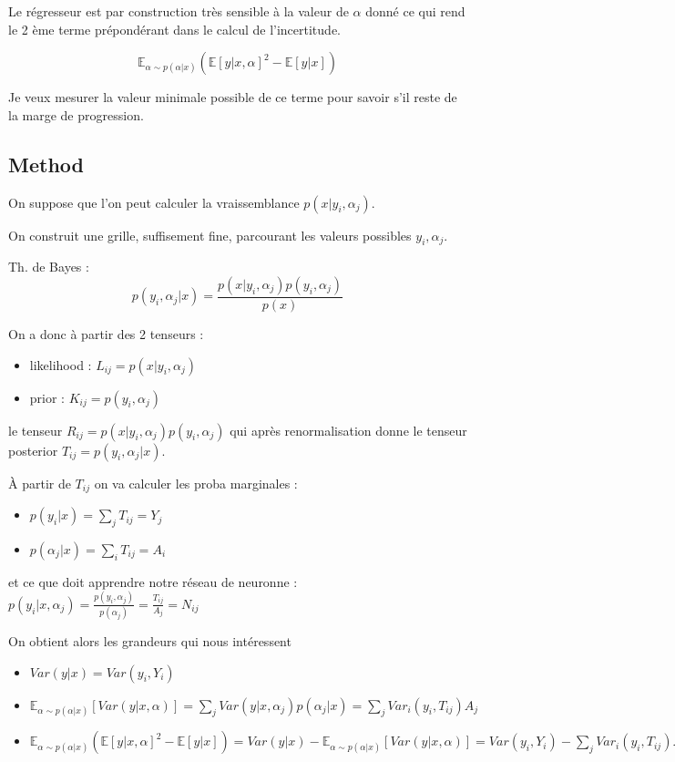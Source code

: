 Le régresseur est par construction très sensible à la valeur de $\alpha$ donné ce qui rend le 2 ème terme prépondérant dans le calcul de l'incertitude.

$$\mathbb E_{\alpha \sim p(\alpha|x)} \left (\mathbb E [y|x, \alpha]^2  - \mathbb E[y|x]\right )$$

Je veux mesurer la valeur minimale possible de ce terme pour savoir s'il reste de la marge de progression.

\subsection{Method} %
\label{sub:method}



On suppose que l'on peut calculer la vraissemblance $p(x|y_i, \alpha_j)$.

On construit une grille, suffisement fine, parcourant les valeurs possibles $y_i, \alpha_j$.

Th. de Bayes : 
$$
    p(y_i, \alpha_j | x) = \frac{p(x|y_i, \alpha_j) p(y_i, \alpha_j)}{p(x)}
$$

On a donc à partir des 2 tenseurs : 
\begin{itemize}
	\item likelihood : $L_{ij} = p(x|y_i, \alpha_j)$
	\item prior : $K_{ij} = p(y_i, \alpha_j)$ 
\end{itemize}

le tenseur $ R_{ij} = p(x|y_i, \alpha_j) p(y_i, \alpha_j) $ 
qui après renormalisation donne le tenseur posterior $ T_{ij} = p(y_i, \alpha_j | x)$.

À partir de $T_{ij}$ on va calculer les proba marginales :
\begin{itemize}
	\item $p(y_i | x) = \sum_j T_{ij} = Y_j$
	\item $p(\alpha_j | x) = \sum_i T_{ij} = A_i$
\end{itemize}

et ce que doit apprendre notre réseau de neuronne : $p(y_i | x, \alpha_j) = \frac{p(y_i, \alpha_j)}{p(\alpha_j)} = \frac{T_{ij}}{A_j} = N_{ij}$

On obtient alors les grandeurs qui nous intéressent
\begin{itemize}
	\item $ Var(y|x) = Var(y_i, Y_i) $
	\item $ \mathbb E_{\alpha \sim p(\alpha|x)}[ Var(y|x, \alpha) ] = \sum_j Var(y|x, \alpha_j) p(\alpha_j | x) = \sum_j Var_i(y_i, T_{ij}) A_j$
	\item $\mathbb E_{\alpha \sim p(\alpha|x)} \left (\mathbb E [y|x, \alpha]^2  - \mathbb E[y|x]\right ) = Var(y|x) - \mathbb E_{\alpha \sim p(\alpha|x)}[ Var(y|x, \alpha) ] = Var(y_i, Y_i) - \sum_j Var_i(y_i, T_{ij}) A_j$
\end{itemize}


